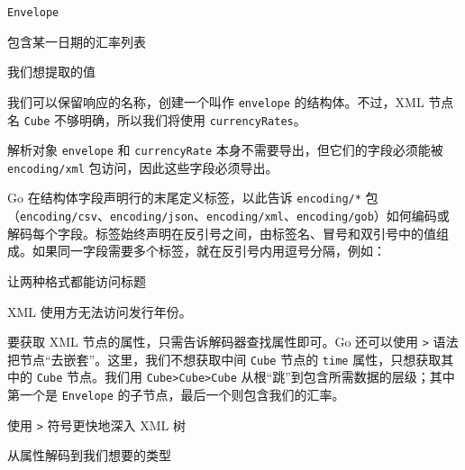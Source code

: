 \begin{codeannotations}
\item \texttt{Envelope}
\item 包含某一日期的汇率列表
\item 我们想提取的值
\end{codeannotations}

我们可以保留响应的名称，创建一个叫作 \texttt{envelope} 的结构体。不过，XML 节点名 \texttt{Cube} 不够明确，所以我们将使用 \texttt{currencyRates}。

解析对象 \texttt{envelope} 和 \texttt{currencyRate} 本身不需要导出，但它们的字段必须能被 \texttt{encoding/xml} 包访问，因此这些字段必须导出。

Go 在结构体字段声明行的末尾定义标签，以此告诉 \nolinkurl{encoding/*} 包（\nolinkurl{encoding/csv}、\nolinkurl{encoding/json}、\nolinkurl{encoding/xml}、\nolinkurl{encoding/gob}）如何编码或解码每个字段。标签始终声明在反引号之间，由标签名、冒号和双引号中的值组成。如果同一字段需要多个标签，就在反引号内用逗号分隔，例如：


\begin{codeannotations}
\item 让两种格式都能访问标题
\item XML 使用方无法访问发行年份。
\end{codeannotations}

要获取 XML 节点的属性，只需告诉解码器查找属性即可。Go 还可以使用 \texttt{>} 语法把节点“去嵌套”。这里，我们不想获取中间 \texttt{Cube} 节点的 \texttt{time} 属性，只想获取其中的 \texttt{Cube} 节点。我们用 \texttt{Cube>Cube>Cube} 从根“跳”到包含所需数据的层级；其中第一个是 \texttt{Envelope} 的子节点，最后一个则包含我们的汇率。


\begin{codeannotations}
\item 使用 \texttt{>} 符号更快地深入 XML 树
\item 从属性解码到我们想要的类型
\end{codeannotations}

